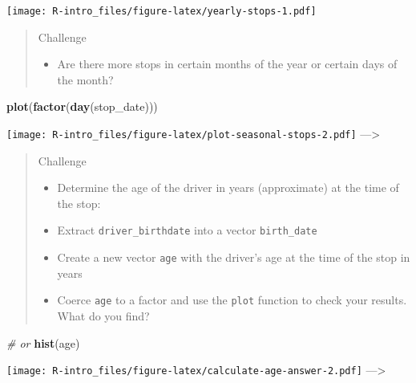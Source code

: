 \documentclass[
]{book}
\newenvironment{Shaded}{\begin{snugshade}}{\end{snugshade}}
\newcommand{\CommentTok}[1]{\textcolor[rgb]{0.56,0.35,0.01}{\textit{#1}}}
\newcommand{\FunctionTok}[1]{\textcolor[rgb]{0.13,0.29,0.53}{\textbf{#1}}}
\newcommand{\NormalTok}[1]{#1}
\providecommand{\tightlist}{%
  \setlength{\itemsep}{0pt}\setlength{\parskip}{0pt}}
\begin{document}
\texttt{[image: R-intro\_files/figure-latex/yearly-stops-1.pdf]}

\begin{quote}
Challenge

\begin{itemize}
\tightlist
\item
  Are there more stops in certain months of the year or certain days of the month?
\end{itemize}
\end{quote}

\begin{Shaded}
\begin{Highlighting}[]
\FunctionTok{plot}\NormalTok{(}\FunctionTok{factor}\NormalTok{(}\FunctionTok{day}\NormalTok{(stop\_date)))}
\end{Highlighting}
\end{Shaded}

\texttt{[image: R-intro\_files/figure-latex/plot-seasonal-stops-2.pdf]}
---\textgreater{}

\begin{quote}
Challenge

\begin{itemize}
\tightlist
\item
  Determine the age of the driver in years (approximate) at the time of the stop:
\item
  Extract \texttt{driver\_birthdate} into a vector \texttt{birth\_date}
\item
  Create a new vector \texttt{age} with the driver's age at the time of the stop in years
\item
  Coerce \texttt{age} to a factor and use the \texttt{plot} function to check your results. What do you find?
\end{itemize}
\end{quote}

\begin{Shaded}
\begin{Highlighting}[]
\CommentTok{\# or}
\FunctionTok{hist}\NormalTok{(age)}
\end{Highlighting}
\end{Shaded}

\texttt{[image: R-intro\_files/figure-latex/calculate-age-answer-2.pdf]}
---\textgreater{}

  
\end{document}
